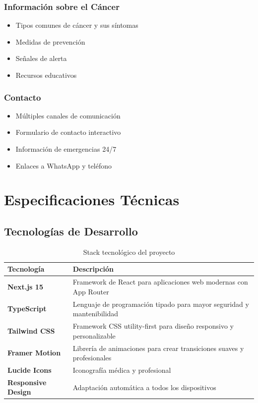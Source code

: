 \documentclass[12pt,a4paper]{article}
\begin{document}
\subsubsection{Información sobre el Cáncer}
\begin{itemize}
    \item Tipos comunes de cáncer y sus síntomas
    \item Medidas de prevención
    \item Señales de alerta
    \item Recursos educativos
\end{itemize}

\subsubsection{Contacto}
\begin{itemize}
    \item Múltiples canales de comunicación
    \item Formulario de contacto interactivo
    \item Información de emergencias 24/7
    \item Enlaces a WhatsApp y teléfono
\end{itemize}

\section{Especificaciones Técnicas}

\subsection{Tecnologías de Desarrollo}

\begin{table}[h]
\centering
\begin{tabularx}{\textwidth}{|l|X|}
\hline
\textbf{Tecnología} & \textbf{Descripción} \\
\hline
\textbf{Next.js 15} & Framework de React para aplicaciones web modernas con App Router \\
\hline
\textbf{TypeScript} & Lenguaje de programación tipado para mayor seguridad y mantenibilidad \\
\hline
\textbf{Tailwind CSS} & Framework CSS utility-first para diseño responsivo y personalizable \\
\hline
\textbf{Framer Motion} & Librería de animaciones para crear transiciones suaves y profesionales \\
\hline
\textbf{Lucide Icons} & Iconografía médica y profesional \\
\hline
\textbf{Responsive Design} & Adaptación automática a todos los dispositivos \\
\hline
\end{tabularx}
\caption{Stack tecnológico del proyecto}
\end{table}
\end{document}
